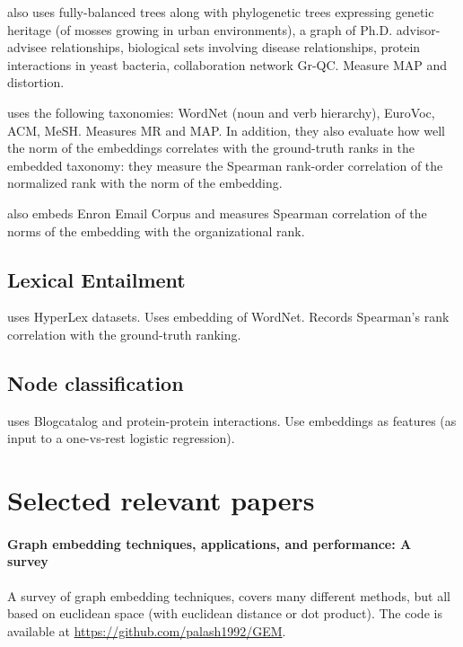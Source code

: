 \documentclass{article}
\begin{document}
\cite{sala2018representation} also uses fully-balanced trees along with phylogenetic trees expressing genetic heritage (of mosses growing in urban
environments), a graph of Ph.D. advisor-advisee relationships, biological sets involving disease relationships, protein interactions in yeast bacteria, collaboration network Gr-QC. Measure MAP and distortion. 

\cite{nickel2018learning} uses the following taxonomies: WordNet (noun and verb hierarchy), EuroVoc, ACM, MeSH. Measures MR and MAP. In addition, they also evaluate how well the norm of the embeddings  correlates with
the ground-truth ranks in the embedded taxonomy: they measure the Spearman rank-order correlation of the normalized rank with the norm of the embedding. 
 
\cite{nickel2018learning} also embeds Enron Email Corpus and measures Spearman correlation of the norms of the embedding with
the organizational rank.

 
\subsection{Lexical Entailment}

\cite{nickel2017poincare} uses HyperLex datasets. Uses embedding of WordNet. Records Spearman’s rank correlation
with the ground-truth ranking. 

\subsection{Node classification}

\cite{goyal2018graph} uses Blogcatalog and protein-protein interactions. Use embeddings as features (as input to a one-vs-rest logistic regression).

\section{Selected relevant papers}

\paragraph{Graph embedding techniques, applications, and performance: A survey~\cite{goyal2018graph}}

A survey of graph embedding techniques, covers many different methods, but all based on euclidean space (with euclidean distance or dot product). The code is available at \url{https://github.com/palash1992/GEM}.
\end{document}
